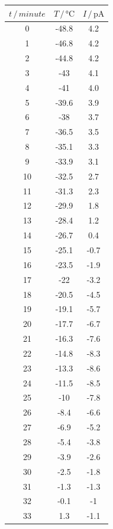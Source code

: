 \begin{table}
    \centering
    \begin{tabular}{S[table-format=2.0] S[table-format=2.0] S[table-format=2.0] |}
        \toprule
        $t \,/\, \si{minute}$ & $T \,/\, \si{\degreeCelsius}$ & $I \,/\, \si{\pico\ampere}$ \\
         & -48.8 & 4.2 \\
        1 & -46.8 & 4.2 \\
        2 & -44.8 & 4.2 \\
        3 & -43 & 4.1 \\
        4 & -41 & 4.0 \\
        5 & -39.6 & 3.9 \\
        6 & -38 & 3.7 \\
        7 & -36.5 & 3.5 \\
        8 & -35.1 & 3.3 \\
        9 & -33.9 & 3.1 \\
        10 & -32.5 & 2.7 \\
        11 & -31.3 & 2.3 \\
        12 & -29.9 & 1.8 \\
        13 & -28.4 & 1.2 \\
        14 & -26.7 & 0.4 \\
        15 & -25.1 & -0.7 \\
        16 & -23.5 & -1.9 \\
        17 & -22 & -3.2 \\
        18 & -20.5 & -4.5 \\
        19 & -19.1 & -5.7 \\
        20 & -17.7 & -6.7 \\
        21 & -16.3 & -7.6 \\
        22 & -14.8 & -8.3 \\
        23 & -13.3 & -8.6 \\
        24 & -11.5 & -8.5 \\
        25 & -10 & -7.8 \\
        26 & -8.4 & -6.6 \\
        27 & -6.9 & -5.2 \\
        28 & -5.4 & -3.8 \\
        29 & -3.9 & -2.6 \\
        30 & -2.5 & -1.8 \\
        31 & -1.3 & -1.3 \\
        32 & -0.1 & -1 \\
        33 & 1.3 & -1.1 \\

\end{tabular}
\end{table}
